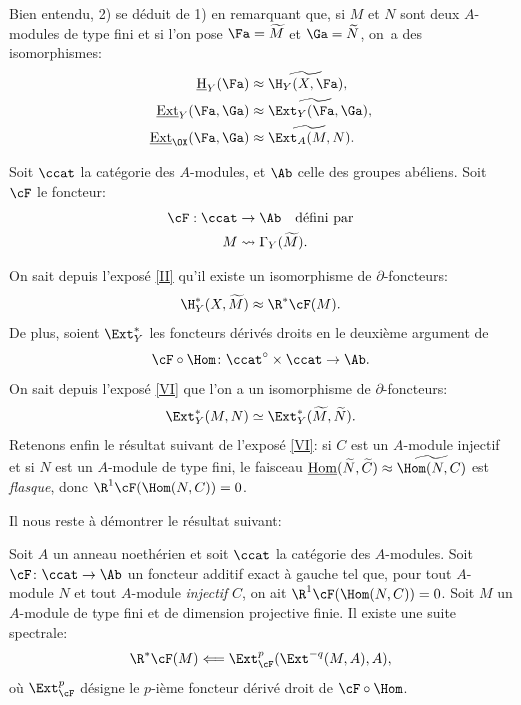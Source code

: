 Bien entendu, 2) se d\'eduit de 1) en remarquant que, si $M$ et $N$ sont deux $A$-modules de type fini et si l'on pose ${{\Fa}}=\widetilde{M}$ et ${{\Ga}}=\widetilde{N}$, on~a des isomorphismes:
\begin{align*}
\mathop{\underline{\mathrm{H}}}\nolimits_Y({\Fa}) &\approx \widetilde{\H_Y(X, {\Fa})}, \\
\mathop{\underline{\mathrm{Ext}}}\nolimits_Y({\Fa}, {\Ga}) &\approx \widetilde{\Ext_Y({\Fa}, {\Ga}}), \\
\mathop{\underline{\mathrm{Ext}}}\nolimits_{\OX}({\Fa}, {\Ga}) &\approx \widetilde{\Ext_A(M, N)}.
\end{align*}

Soit $\ccat$ la cat\'egorie des $A$-modules, et $\Ab$ celle des groupes ab\'eliens. Soit ${\cF}$ le foncteur:
\begin{align*}
\cF: \ccat&\to \Ab \quad\text{défini par} \\
 M &\rightsquigarrow \Gamma_Y(\widetilde{M}).
\end{align*}

On sait depuis l'expos\'e \ref{II} qu'il existe un isomorphisme de $\partial$-foncteurs:
\[
\H^\ast_Y(X, \widetilde{M})\approx \R^\ast {\cF}(M).
\]
De plus, soient $\Ext^\ast_Y$ les foncteurs d\'eriv\'es droits en le deuxi\`eme argument de
\[{\cF}\circ \Hom\colon \ccat^\circ \times \ccat \to \Ab.
\]
On sait depuis l'expos\'e \ref{VI} que l'on a un isomorphisme de $\partial$-foncteurs:
\[
\Ext^\ast_Y(M, N)\simeq \Ext^\ast_Y(\widetilde{M}, \widetilde{N}).
\]
Retenons enfin le r\'esultat suivant de l'expos\'e \ref{VI}: si $C$ est un $A$-module injectif et si $N$ est un $A$-module de type fini, le faisceau $\mathop{\underline{\mathrm{Hom}}}\nolimits(\widetilde{N}, \widetilde{C})\approx\widetilde{\Hom(N, C)}$ est \emph{flasque}, donc $\R^1{\cF}(\Hom(N, C))=0$.

Il nous reste \`a d\'emontrer le r\'esultat suivant:

\begin{lemme} \label{VIII.1.2} Soit $A$ un anneau noeth\'erien et soit $\ccat$ la cat\'egorie des $A$-modules. Soit ${\cF}\colon \ccat\to\Ab$ un foncteur additif exact \`a gauche tel que, pour tout $A$-module $N$ \ignorespaces et tout $A$-module \emph{injectif} $C$, on ait $\R^1{\cF}(\Hom(N, C))=0$. Soit $M$ un $A$-module de type fini et de dimension projective finie. Il existe une suite spectrale:
\[
\R^\ast {\cF}(M)\Longleftarrow \Ext^p_{{\cF}}(\Ext^{-q}(M, A), A), \]
o\`u $\Ext^p_{{\cF}}$ d\'esigne le $p$-i\`eme foncteur d\'eriv\'e droit de ${\cF}\circ \Hom$.
\end{lemme}

